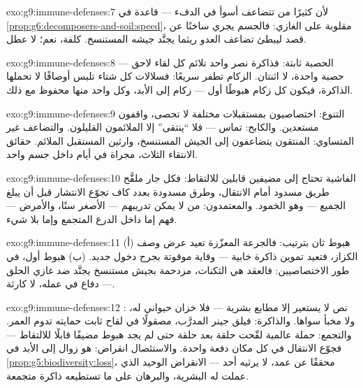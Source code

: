 \begin{solution}{exo:g9:immune-defenses:7}
لأن كثيرًا من  تتضاعف أسوأ في الدفء --- قاعدة
 في \cref{prop:g6:decomposers-and-soil:speed}،
مقلوبة على الغازي: فالجسم يجري ساخنًا عن قصد ليبطئ
تضاعف العدو ريثما يجنَّد جيشه المستنسخ. كلفة، نعم؛ لا
عطل.
\end{solution}

\begin{solution}{exo:g9:immune-defenses:8}
 الحصبة ثابتة: فذاكرة نصر واحد تلائم كل لقاء
لاحق --- حصبة واحدة، لا اثنتان.  الزكام تطفر
سريعًا: فسلالات كل شتاء تلبس أوصافًا لا تحملها الذاكرة،
فيكون كل زكام هبوطًا أول --- زكام إلى الأبد، وكل واحد
منها محفوظ مع ذلك.
\end{solution}

\begin{solution}{exo:g9:immune-defenses:9}
التنوع: اختصاصيون بمستقبلات مختلفة لا تحصى، واقفون
مستعدين. والكابح: تماس  --- فلا ``ينتقى'' إلا
الملائمون القليلون. والتضاعف غير المتساوي: المنتقون
يتضاعفون إلى الجيش المستنسخ، وارثين المستقبل الملائم.
حقائق الانتقاء الثلاث، مجراة في أيام داخل جسم واحد.
\end{solution}

\begin{solution}{exo:g9:immune-defenses:10}
الفاشية تحتاج إلى مضيفين قابلين للالتقاط: فكل جار
ملقَّح طريق مسدود أمام الانتقال، وطرق مسدودة بعدد كاف
تجوّع الانتشار قبل أن يبلغ الجميع --- وهو الخمود.
والمعتمدون: من لا يمكن تدريبهم --- الأصغر سنًا،
والأمرض --- فهم إما داخل الدرع المتجمع وإما بلا شيء.
\end{solution}

\begin{solution}{exo:g9:immune-defenses:11}
(أ) هبوط ثان بترتيب: فالجرعة المعزّزة تعيد عرض وصف
الكزاز، فتعيد تموين ذاكرة خابية --- وقاية موقوتة بجرح
دخول جديد. (ب) هبوط أول، في طور الاختصاصيين: فالعقد هي
الثكنات، مزدحمة بجيش مستنسخ يجنَّد ضد غازي الحلق ---
دفاع في عمله، لا كارثة.
\end{solution}

\begin{solution}{exo:g9:immune-defenses:12}
: نص لا يستعير إلا مطابع بشرية --- فلا خزان
حيواني له، ولا مخبأ سواها. والذاكرة: فيلق جينر
المدرَّب، مصقولًا في لقاح ثابت حمايته تدوم العمر.
والتجمع: حملة عالمية لقّحت حلقة بعد حلقة حتى لم يجد
هبوط مضيفًا قابلًا للالتقاط --- فجوّع الانتقال في كل
مكان دفعة واحدة. والاستئصال انقراض: هو زوال  إلى
الأبد في \cref{prop:g5:biodiversity:loss}، محققًا عن
عمد، لا يرثيه أحد --- الانقراض الوحيد الذي عملت له
البشرية، والبرهان على ما تستطيعه ذاكرة متجمعة.
\end{solution}

